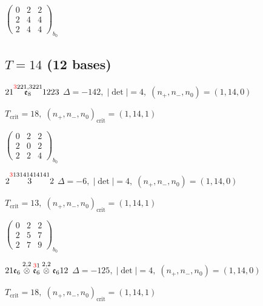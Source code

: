\documentclass[10pt]{article}
\begin{document}
\hspace{2em}$\left(\begin{smallmatrix}0 & 2 & 2 \\ 2 & 4 & 4 \\ 2 & 4 & 4\end{smallmatrix}\right)_{\!b_0}$


\subsection*{$T = 14$ \quad (12 bases)}
\smallskip

$21\overset{\textcolor{red}{3}221,3221}{\mathfrak{e}_8}1223$ \quad $\Delta=-142,\; |\det|=4,\; (n_+,n_-,n_0)=(1,14,0)$

\hspace{1em}$T_{\text{crit}}=18,\; (n_+,n_-,n_0)_{\text{crit}}=(1,14,1)$

\hspace{2em}$\left(\begin{smallmatrix}0 & 2 & 2 \\ 2 & 0 & 2 \\ 2 & 2 & 4\end{smallmatrix}\right)_{\!b_0}$

\smallskip

$2\overset{\textcolor{red}{3}13141414141}{3}2$ \quad $\Delta=-6,\; |\det|=4,\; (n_+,n_-,n_0)=(1,14,0)$

\hspace{1em}$T_{\text{crit}}=13,\; (n_+,n_-,n_0)_{\text{crit}}=(1,14,1)$

\hspace{2em}$\left(\begin{smallmatrix}0 & 2 & 2 \\ 2 & 5 & 7 \\ 2 & 7 & 9\end{smallmatrix}\right)_{\!b_0}$

\smallskip

$21\mathfrak{e}_6\overset{2,2}{\otimes}\overset{\textcolor{red}{3}1}{\mathfrak{e}_6}\overset{2,2}{\otimes}\mathfrak{e}_612$ \quad $\Delta=-125,\; |\det|=4,\; (n_+,n_-,n_0)=(1,14,0)$

\hspace{1em}$T_{\text{crit}}=18,\; (n_+,n_-,n_0)_{\text{crit}}=(1,14,1)$
\end{document}
